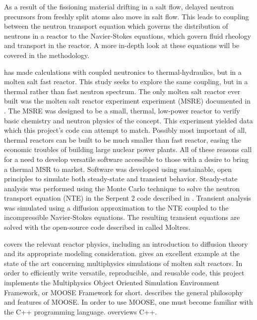 	As a result of the fissioning material drifting in a salt flow, delayed neutron precursors from freshly split atoms also move in salt flow. This leads to coupling between the neutron transport equation which governs the distribution of neutrons in a reactor to the Navier-Stokes equations, which govern fluid rheology and transport in the reactor. A more in-depth look at these equations will be covered in the methodology.

\cite{aufiero_calculating_2014} has made calculations with coupled neutronics to thermal-hydraulics, but in a molten
salt fast reactor. This study seeks to explore the same coupling, but in a thermal rather than fast
neutron spectrum. The only molten salt reactor ever built was the molten salt reactor experiment experiment (MSRE) documented in \cite{robertson_msre}. The MSRE was designed to be a small, thermal, low-power reactor to verify basic chemistry and neutron physics of the concept. This experiment yielded data which this project’s code can attempt to match. Possibly most important of all, thermal reactors can be built to be much smaller than fast reactor, easing the economic troubles of building large nuclear power plants. All of these reasons call for a need to develop versatile software accessible to those with a desire to bring a thermal MSR to market.
	Software was developed using sustainable, open principles to simulate both steady-state and transient behavior. Steady-state analysis was  performed using the Monte Carlo technique to solve the neutron transport equation (NTE) in the Serpent 2 code described in \cite{serp}. Transient analysis was simulated using a diffusion approximation to the NTE coupled to the incompressible Navier-Stokes equations. The resulting transient equations are solved with the open-source code described in \cite{moltres} called Moltres.

	\cite{duderstadt_nuclear_1976} covers the relevant reactor physics, including an introduction to diffusion theory and its appropriate modeling consideration. \cite{gaston_moose:_2009} gives an excellent example at the state of the art concerning multiphysics simulations of molten salt reactors. In order to efficiently write versatile, reproducible, and reusable code, this project implements the Multiphysics Object Oriented Simulation Environment Framework, or MOOSE Framework for short. \cite{aufiero_calculating_2014} describes the general philosophy and features of MOOSE. In order to use MOOSE, one must become familiar with the C++ programming language. \cite{schildt_c++:_2003} overviews C++.
    
